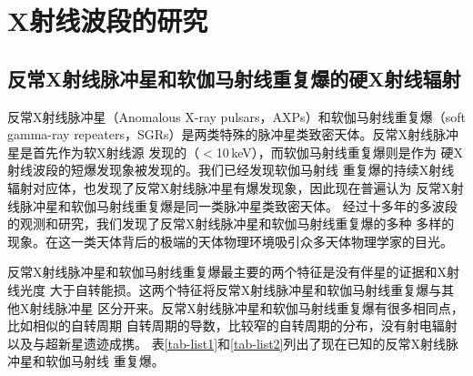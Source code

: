 
\def\qui {1E 1547-54}
\def\uu {4U~0142$+$61}
\def\oo {1E~1048$-$59}
\def\kes {1E~1841$-$045}
\def\axj {AX~J1845$-$02}
\def\rxs {1RXS~J1708$-$40}
\def\eee {1E~2259$+$586}
\def\xte {XTE~J1810$-$197}
\def\cxo {CXOU~J1647$-$45}
\def\smc {CXOU~J0100-72}
\def\zerosei {SGR~1806$-$20}
\def\zerozero {SGR~1900$+$14}
\def\sedici {SGR~1627$-$41}
\def\lmc {SGR~0526$-$66}
\def\quil {1E 1547.0-5408}
\def\uul {4U~0142$+$61}
\def\ool {1E~1048$-$586}
\def\kesl {1E~1841$-$045}
\def\axjl {AX~J1844.8$-$0256}
\def\rxsl {1RXS~J170849$-$400910}
\def\eel {1E~2259$+$586}
\def\xtel {XTE~J1810$-$197}
\def\cxol {CXOU~J164710.2$-$455216}
\def\smcl {CXOU~J010043.1-721134}

\chapter{X射线波段的研究}

\section{反常X射线脉冲星和软伽马射线重复爆的硬X射线辐射}

反常X射线脉冲星（Anomalous X-ray pulsars，AXPs）和软伽马射线重复爆（soft gamma-ray 
repeaters，SGRs）是两类特殊的脉冲星类致密天体。反常X射线脉冲星是首先作为软X射线源
发现的（$<$10\,keV）\supercite{fg81,scs86,ims94}，而软伽马射线重复爆则是作为
硬X射线波段的短爆发现象被发现的\supercite{mgg+79,mgi+79}。我们已经发现软伽马射线
重复爆的持续X射线辐射对应体，也发现了反常X射线脉冲星有爆发现象，因此现在普遍认为
反常X射线脉冲星和软伽马射线重复爆是同一类脉冲星类致密天体\supercite{m08}。
%
经过十多年的多波段的观测和研究，我们发现了反常X射线脉冲星和软伽马射线重复爆的多种
多样的现象。在这一类天体背后的极端的天体物理环境吸引众多天体物理学家的目光\supercite{m08}。

反常X射线脉冲星和软伽马射线重复爆最主要的两个特征是没有伴星的证据和X射线光度
大于自转能损。这两个特征将反常X射线脉冲星和软伽马射线重复爆与其他X射线脉冲星
区分开来。反常X射线脉冲星和软伽马射线重复爆有很多相同点，比如相似的自转周期
自转周期的导数，比较窄的自转周期的分布，没有射电辐射以及与超新星遗迹成携。
表\ref{tab-list1}和\ref{tab-list2}列出了现在已知的反常X射线脉冲星和软伽马射线
重复爆\supercite{m08}。

